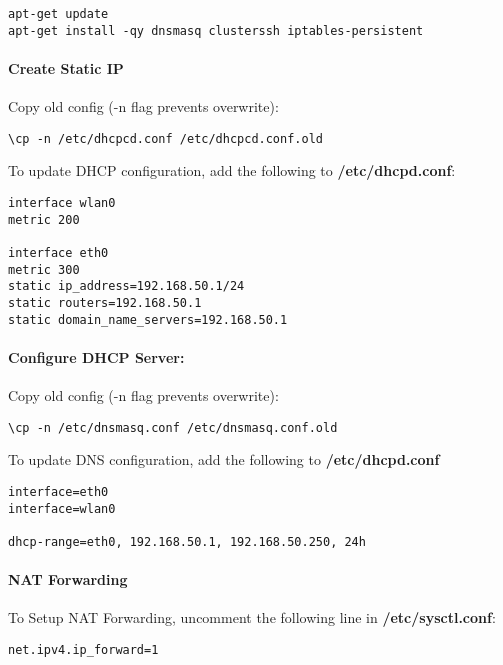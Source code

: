 \begin{lstlisting}
apt-get update
apt-get install -qy dnsmasq clusterssh iptables-persistent
\end{lstlisting}

\paragraph{Create Static IP}

Copy old config (-n flag prevents overwrite):

\begin{lstlisting}
\cp -n /etc/dhcpcd.conf /etc/dhcpcd.conf.old
\end{lstlisting}

To update DHCP configuration, add the following to
\textbf{/etc/dhcpd.conf}:

\begin{lstlisting}
interface wlan0
metric 200

interface eth0
metric 300
static ip_address=192.168.50.1/24
static routers=192.168.50.1
static domain_name_servers=192.168.50.1
\end{lstlisting}

\paragraph{Configure DHCP Server:}

Copy old config (-n flag prevents overwrite):

\begin{lstlisting}
\cp -n /etc/dnsmasq.conf /etc/dnsmasq.conf.old
\end{lstlisting}

To update DNS configuration, add the following to
\textbf{/etc/dhcpd.conf}

\begin{lstlisting}
interface=eth0
interface=wlan0

dhcp-range=eth0, 192.168.50.1, 192.168.50.250, 24h
\end{lstlisting}

\paragraph{NAT Forwarding}

To Setup NAT Forwarding, uncomment the following line in
\textbf{/etc/sysctl.conf}:

\begin{lstlisting}
net.ipv4.ip_forward=1
\end{lstlisting}

